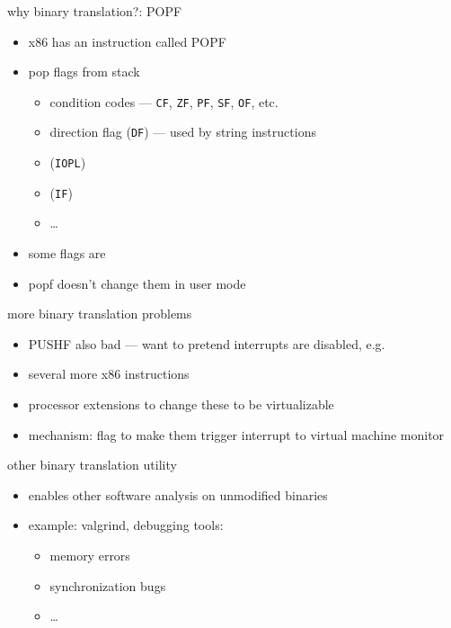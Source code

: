 
\begin{frame}{why binary translation?: POPF}
    \begin{itemize}
    \item x86 has an instruction called POPF
    \item pop flags from stack
    \begin{itemize}
    \item condition codes --- {\tt CF}, {\tt ZF}, {\tt PF}, {\tt SF}, {\tt OF}, etc.
    \item direction flag ({\tt DF}) --- used by string instructions
    \item \textbf<2>{} ({\tt IOPL})
    \item \textbf<2>{} ({\tt IF})
    \item \ldots
    \end{itemize}
    \item<2> some flags are 
    \item<2> popf  doesn't change them in user mode
    \end{itemize}
\end{frame}

\begin{frame}{more binary translation problems}
    \begin{itemize}
    \item PUSHF also bad --- want to pretend interrupts are disabled, e.g.
    \item several more x86 instructions
    \vspace{.5cm}
    \item processor extensions to change these to be virtualizable
    \item mechanism: flag to make them trigger interrupt to virtual machine monitor
    \end{itemize}
\end{frame}

\begin{frame}{other binary translation utility}
    \begin{itemize}
    \item enables other software analysis on unmodified binaries
    \item example: valgrind, debugging tools:   
        \begin{itemize}
        \item memory errors
        \item synchronization bugs
        \item \ldots
        \end{itemize}
    \end{itemize}
\end{frame}

